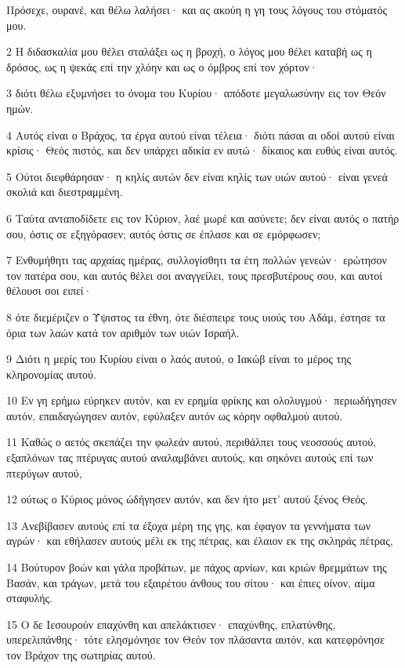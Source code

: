 \par Πρόσεχε, ουρανέ, και θέλω λαλήσει· και ας ακούη η γη τους λόγους του στόματός μου.
\par 2 Η διδασκαλία μου θέλει σταλάξει ως η βροχή, ο λόγος μου θέλει καταβή ως η δρόσος, ως η ψεκάς επί την χλόην και ως ο όμβρος επί τον χόρτον·
\par 3 διότι θέλω εξυμνήσει το όνομα του Κυρίου· απόδοτε μεγαλωσύνην εις τον Θεόν ημών.
\par 4 Αυτός είναι ο Βράχος, τα έργα αυτού είναι τέλεια· διότι πάσαι αι οδοί αυτού είναι κρίσις· Θεός πιστός, και δεν υπάρχει αδικία εν αυτώ· δίκαιος και ευθύς είναι αυτός.
\par 5 Ούτοι διεφθάρησαν· η κηλίς αυτών δεν είναι κηλίς των υιών αυτού· είναι γενεά σκολιά και διεστραμμένη.
\par 6 Ταύτα ανταποδίδετε εις τον Κύριον, λαέ μωρέ και ασύνετε; δεν είναι αυτός ο πατήρ σου, όστις σε εξηγόρασεν; αυτός όστις σε έπλασε και σε εμόρφωσεν;
\par 7 Ενθυμήθητι τας αρχαίας ημέρας, συλλογίσθητι τα έτη πολλών γενεών· ερώτησον τον πατέρα σου, και αυτός θέλει σοι αναγγείλει, τους πρεσβυτέρους σου, και αυτοί θέλουσι σοι ειπεί·
\par 8 ότε διεμέριζεν ο Ύψιστος τα έθνη, ότε διέσπειρε τους υιούς του Αδάμ, έστησε τα όρια των λαών κατά τον αριθμόν των υιών Ισραήλ.
\par 9 Διότι η μερίς του Κυρίου είναι ο λαός αυτού, ο Ιακώβ είναι το μέρος της κληρονομίας αυτού.
\par 10 Εν γη ερήμω εύρηκεν αυτόν, και εν ερημία φρίκης και ολολυγμού· περιωδήγησεν αυτόν, επαιδαγώγησεν αυτόν, εφύλαξεν αυτόν ως κόρην οφθαλμού αυτού.
\par 11 Καθώς ο αετός σκεπάζει την φωλεάν αυτού, περιθάλπει τους νεοσσούς αυτού, εξαπλόνων τας πτέρυγας αυτού αναλαμβάνει αυτούς, και σηκόνει αυτούς επί των πτερύγων αυτού,
\par 12 ούτως ο Κύριος μόνος ώδήγησεν αυτόν, και δεν ήτο μετ' αυτού ξένος Θεός.
\par 13 Ανεβίβασεν αυτούς επί τα έξοχα μέρη της γης, και έφαγον τα γεννήματα των αγρών· και εθήλασεν αυτούς μέλι εκ της πέτρας, και έλαιον εκ της σκληράς πέτρας,
\par 14 Βούτυρον βοών και γάλα προβάτων, με πάχος αρνίων, και κριών θρεμμάτων της Βασάν, και τράγων, μετά του εξαιρέτου άνθους του σίτου· και έπιες οίνον, αίμα σταφυλής.
\par 15 Ο δε Ιεσουρούν επαχύνθη και απελάκτισεν· επαχύνθης, επλατύνθης, υπερελιπάνθης· τότε ελησμόνησε τον Θεόν τον πλάσαντα αυτόν, και κατεφρόνησε τον Βράχον της σωτηρίας αυτού.
